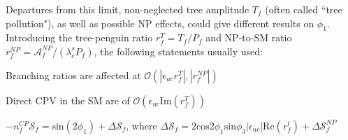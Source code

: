 Departures from this limit, non-neglected tree amplitude $T_f$ (often called ``tree pollution"), as well as possible NP effects, could give different results on $\phi_1$. Introducing the tree-penguin ratio $r^T_f = T_f / P_f$ and NP-to-SM ratio $r^{NP}_f = \mathcal{A}^{NP}_f / (\lambda^s_c P_f)$, the following statements usually used\cite{b2book}:

\textbullet \space Branching ratios are affected at $\mathcal{O}(|\epsilon_{uc}r^T_f|,|r^{NP}_f|)$

\textbullet \space Direct CPV in the SM are of $\mathcal{O}(\epsilon_{uc}\text{Im}(r^T_f))$


\textbullet \space $-n^{CP}_f\mathcal{S}_f = \text{sin}(2\phi_1) + \Delta \mathcal{S}_f$, where
$\Delta \mathcal{S}_f=2\text{cos}2\phi_1 \text{sin}\phi_3 |\epsilon_{uc}| \text{Re}(r^t_f) + \Delta \mathcal{S}^{NP}_f$


